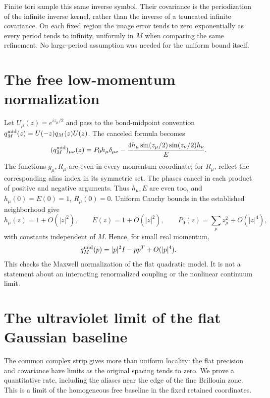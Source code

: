 \documentclass[11pt]{article}
\theoremstyle{remark}
\begin{document}
Finite tori sample this same inverse symbol. Their covariance is the
periodization of the infinite inverse kernel, rather than the inverse
of a truncated infinite covariance. On each fixed region the image
error tends to zero exponentially as every period tends to infinity,
uniformly in $M$ when comparing the same refinement. No large-period
assumption was needed for the uniform bound itself.

\section{The free low-momentum normalization}

Let $U_\mu(z)=e^{iz_\mu/2}$ and pass to the bond-midpoint convention
$q_M^{\rm mid}(z)=U(-z)q_M(z)U(z)$. The canceled formula becomes
\[
 (q_M^{\rm mid})_{\mu\nu}(z)
 =P_0h_\mu\delta_{\mu\nu}
  -\frac{4h_\mu\sin(z_\mu/2)\sin(z_\nu/2)h_\nu}{E}.
\]
The functions $g_\mu,R_\mu$ are even in every momentum coordinate;
for $R_\mu$, reflect the corresponding alias index in its symmetric
set. The phases cancel in each product of positive and negative
arguments. Thus $h_\mu,E$ are even too, and
$h_\mu(0)=E(0)=1$, $R_\mu(0)=0$.
Uniform Cauchy bounds in the established neighborhood give
\[
 h_\mu(z)=1+O(|z|^2),\qquad E(z)=1+O(|z|^2),\qquad
 P_0(z)=\sum_\mu z_\mu^2+O(|z|^4),
\]
with constants independent of $M$. Hence, for small real momentum,
\[
 q_M^{\rm mid}(p)=|p|^2I-pp^T+O(|p|^4).
\]
This checks the Maxwell normalization of the flat quadratic model.
It is not a statement about an interacting renormalized coupling
or the nonlinear continuum limit.

\section{The ultraviolet limit of the flat Gaussian baseline}
\label{limit-section}

The common complex strip gives more than uniform locality: the flat
precision and covariance have limits as the original spacing tends to
zero. We prove a quantitative rate, including the aliases near the edge
of the fine Brillouin zone. This is a limit of the homogeneous free
baseline in the fixed retained coordinates.
\end{document}
